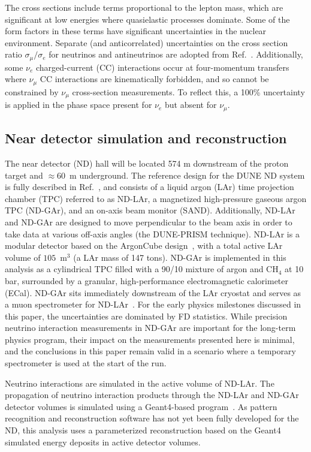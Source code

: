 The cross sections include terms proportional to the lepton mass, which are significant at low energies where quasielastic processes dominate. Some of the form factors in these terms have significant uncertainties in the nuclear environment. Separate (and anticorrelated) uncertainties on the cross section ratio $\sigma_\mu/\sigma_e$ for neutrinos and antineutrinos are adopted from Ref.~\cite{Day:2012gb}. Additionally, some $\nu_e$ charged-current (CC) interactions occur at four-momentum transfers where $\nu_\mu$ CC interactions are kinematically forbidden, and so cannot be constrained by $\nu_\mu$ cross-section measurements. To reflect this, a 100\% uncertainty is applied in the phase space present for $\nu_e$ but absent for $\nu_\mu$.

\subsection{Near detector simulation and reconstruction}
The near detector (ND) hall will be located 574 m downstream of the proton target and $\approx$60~m underground. The reference design for the DUNE ND system is fully described in Ref.~\cite{AbedAbud:2021hpb}, and consists of a liquid argon (LAr) time projection chamber (TPC) referred to as ND-LAr, a magnetized high-pressure gaseous argon TPC (ND-GAr), and an on-axis beam monitor (SAND). Additionally, ND-LAr and ND-GAr are designed to move perpendicular to the beam axis in order to take data at various off-axis angles (the DUNE-PRISM technique). ND-LAr is a modular detector based on the ArgonCube design~\cite{argoncube_loi, Dwyer:2018phu, arclight}, with a total active LAr volume of $105$~m$^{3}$ (a LAr mass of 147 tons). ND-GAr is implemented in this analysis as a cylindrical TPC filled with a 90/10 mixture of argon and CH$_{4}$ at 10 bar, surrounded by a granular, high-performance electromagnetic calorimeter (ECal). ND-GAr sits immediately downstream of the LAr cryostat and serves as a muon spectrometer for ND-LAr~\cite{AbedAbud:2021hpb}. For the early physics milestones discussed in this paper, the uncertainties are dominated by FD statistics.  While precision neutrino interaction measurements in ND-GAr are important for the long-term physics program, their impact on the measurements presented here is minimal, and the conclusions in this paper remain valid in a scenario where a temporary spectrometer is used at the start of the run.

Neutrino interactions are simulated in the active volume of ND-LAr. The propagation of neutrino interaction products through the ND-LAr and ND-GAr detector volumes is simulated using a Geant4-based program~\cite{Agostinelli:2002hh}. As pattern recognition and reconstruction software has not yet been fully developed for the ND, this analysis uses a parameterized reconstruction based on the Geant4 simulated energy deposits in active detector volumes.

